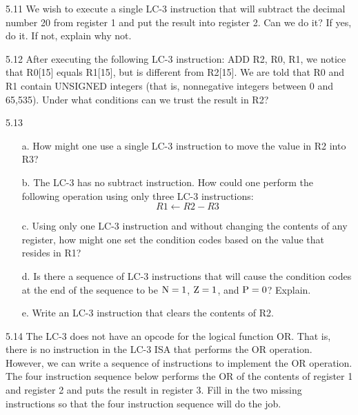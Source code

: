 \documentclass{patt}
\begin{document}
\begin{exercises}
\item[5.11] We wish to execute a single LC-3 instruction that will
  subtract the decimal number 20 from register 1 and put the result
  into register 2. Can we do it? If yes, do it. If not, explain why
  not.

\item[5.12] After executing the following LC-3 instruction: ADD R2,
  R0, R1, we notice that R0[15] equals R1[15], but is different from
  R2[15]. We are told that R0 and R1 contain UNSIGNED integers (that
  is, nonnegative integers between 0 and 65,535). Under what
  conditions can we trust the result in R2?

\egroup

\pagebreak

\item[5.13]
\begin{enumerate}[a.]
\item[a.]  How might one use a single LC-3 instruction to move the
  value in R2 into R3?

\item[b.]  The LC-3 has no subtract instruction. How could one perform
  the following operation using only three LC-3 instructions:
\begin{equation*}
R1 \leftarrow R2-R3
\end{equation*}

\item[c.]  Using only one LC-3 instruction and without changing the
  contents of any register, how might one set the condition codes
  based on the value that resides in R1?

\item[d.]  Is there a sequence of LC-3 instructions that will cause
  the condition codes at the end of the sequence to be ${\rm N}=1$,
  ${\rm Z}=1$, and ${\rm P}=0$?  Explain.

\item[e.]
Write an LC-3 instruction that clears the contents of R2.
\end{enumerate}

\item[5.14] The LC-3 does not have an opcode for the logical function
  OR. That is, there is no instruction in the LC-3 ISA that performs
  the OR operation. However, we can write a sequence of instructions
  to implement the OR operation. The four instruction sequence below
  performs the OR of the contents of register 1 and register 2 and
  puts the result in register 3. Fill in the two missing instructions
  so that the four instruction sequence will do the job.


\end{exercises}
\end{document}
